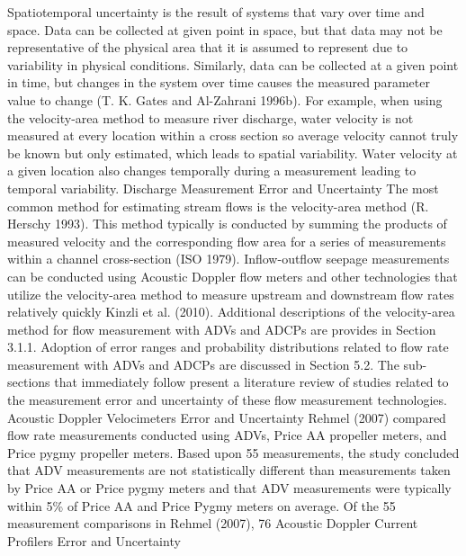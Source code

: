 \begin{linenumbers}
Spatiotemporal uncertainty is the result of systems that vary over time and space.  Data can be collected at given point in space, but that data may not be representative of the physical area that it is assumed to represent due to variability in physical conditions.  Similarly, data can be collected at a given point in time, but changes in the system over time causes the measured parameter value to change (T. K. Gates and Al-Zahrani 1996b).  For example, when using the velocity-area method to measure river discharge, water velocity is not measured at every location within a cross section so average velocity cannot truly be known but only estimated, which leads to spatial variability.  Water velocity at a given location also changes temporally during a measurement leading to temporal variability.
Discharge Measurement Error and Uncertainty
The most common method for estimating stream flows is the velocity-area method (R. Herschy 1993).  This method typically is conducted by summing the products of measured velocity and the corresponding flow area for a series of measurements within a channel cross-section (ISO 1979).  Inflow-outflow seepage measurements can be conducted using Acoustic Doppler flow meters and other technologies that utilize the velocity-area method to measure upstream and downstream flow rates relatively quickly Kinzli et al. (2010).  Additional descriptions of the velocity-area method for flow measurement with ADVs and ADCPs are provides in Section 3.1.1.  Adoption of error ranges and probability distributions related to flow rate measurement with ADVs and ADCPs are discussed in Section 5.2.  The sub-sections that immediately follow present a literature review of studies related to the measurement error and uncertainty of these flow measurement technologies.  
Acoustic Doppler Velocimeters Error and Uncertainty
Rehmel (2007) compared flow rate measurements conducted using ADVs, Price AA propeller meters, and Price pygmy propeller meters.  Based upon 55 measurements, the study concluded that ADV measurements are not statistically different than measurements taken by Price AA or Price pygmy meters and that ADV measurements were typically within 5\% of Price AA and Price Pygmy meters on average.  Of the 55 measurement comparisons in Rehmel (2007), 76%
Acoustic Doppler Current Profilers Error and Uncertainty

\end{linenumbers}
